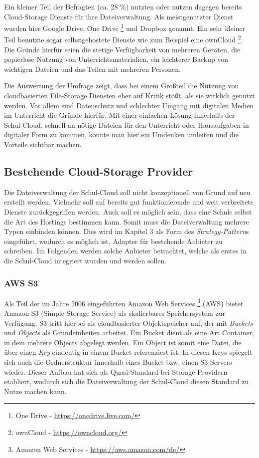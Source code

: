 Ein kleiner Teil der Befragten (ca. 28 \%) nutzten oder nutzen dagegen bereits Cloud-Storage Dienste für ihre Dateiverwaltung. Als meistgenutzter Dienst wurden hier Google Drive, One Drive  \footnote{One Drive - \url{https://onedrive.live.com/}} und Dropbox genannt. Ein sehr kleiner Teil benutzte sogar selbstgehostete Dienste wie zum Beispiel eine ownCloud \footnote{ownCloud - \url{https://owncloud.org/}}. Die Gründe hierfür seien die stetige Verfügbarkeit von mehreren Geräten, die papierlose Nutzung von Unterrichtsmaterialien, ein leichterer Backup von wichtigen Dateien und das Teilen mit mehreren Personen. 

Die Auswertung der Umfrage zeigt, dass bei einem Großteil die Nutzung von cloudbasierten File-Storage Diensten eher auf Kritik stößt, als sie wirklich genutzt werden. Vor allem sind Datenschutz und schlechter Umgang mit digitalen Medien im Unterricht die Gründe hierfür. Mit einer einfachen Lösung innerhalb der Schul-Cloud, schnell an nötige Dateien für den Unterricht oder Hausaufgaben in digitaler Form zu kommen, könnte man hier ein Umdenken umleiten und die Vorteile sichtbar machen.

\subsection{Bestehende Cloud-Storage Provider}

Die Dateiverwaltung der Schul-Cloud soll nicht konzeptionell von Grund auf neu erstellt werden. Vielmehr soll auf bereits gut funktionierende und weit verbreitete Dienste zurückgegriffen werden. Auch soll es möglich sein, dass eine Schule selbst die Art des Hostings bestimmen kann. Somit muss die Dateiverwaltung mehrere Typen einbinden können. Dies wird im Kapitel 3 als Form des \textit{Strategy-Pattern}s eingeführt, wodurch es möglich ist, Adapter für bestehende Anbieter zu schreiben. Im Folgenden werden solche Anbieter betrachtet, welche als erstes in die Schul-Cloud integriert wurden und werden sollen.

\subsubsection{AWS S3}
\label{sec:awss3related}

Als Teil der im Jahre 2006 eingeführten Amazon Web Services \footnote{Amazon Web Services - \url{https://aws.amazon.com/de/}} (AWS) bietet Amazon S3 (Simple Storage Service) als skalierbares Speichersystem zur Verfügung. S3 tritt hierbei als cloudbasierter Objektspeicher auf, der mit \textit{Buckets} und \textit{Objects} als Grundeinheiten arbeitet. Ein Bucket dient als eine Art Container, in dem mehrere Objects abgelegt werden. Ein Object ist somit eine Datei, die über einen \textit{Key} eindeutig in einem Bucket referenziert ist. In diesen Keys spiegelt sich auch die Ordnerstruktur innerhalb eines Bucket bzw. einen S3-Servers wieder. Dieser Aufbau hat sich als Quasi-Standard bei Storage Providern etabliert, wodurch sich die Dateiverwaltung der Schul-Cloud diesen Standard zu Nutze machen kann.

